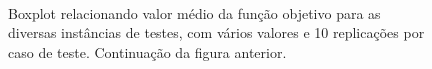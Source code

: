 \documentclass[12pt]{article}
\begin{document}
\begin{figure}
   \ContinuedFloat
   \\
   \caption{Boxplot relacionando valor médio da função objetivo para as diversas 
      instâncias de testes, com vários valores \bm{$\alpha$} e 10 replicações
      por caso de teste. Continuação da figura anterior.}
\end{figure}



\end{document}

